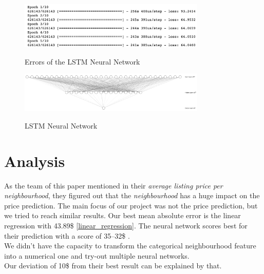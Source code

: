 \documentclass[journal]{IEEEtran}
\begin{document}
\begin{figure}
  \begin{center}
  \includegraphics[width=3.5in]{photo/lstm.png}\\
  \caption{Errors of the LSTM Neural Network}\label{nn}
  \end{center}
\end{figure}
\begin{figure}
  \begin{center}
  \includegraphics[width=3.5in]{photo/nn.png}\\
  \caption{LSTM Neural Network}\label{lstm}
  \end{center}
\end{figure}

\section{Analysis}

As the team of this paper \cite{RN1} mentioned in their \textit{average listing price per neighbourhood}, they figured out that the \textit{neighbourhood} has a huge impact on the price prediction. The main focus of our project was not the price prediction, but we tried to reach similar results. Our best mean absolute error is the linear regression with 43.89\$ \ref{linear_regression}. The neural network scores best for their prediction with a score of 35–32\$ \cite{RN1}. \\
We didn't have the capacity to transform the categorical neighbourhood feature into a numerical one and try-out multiple neural networks. \\
Our deviation of 10\$ from their best result can be explained by that.
\end{document}
